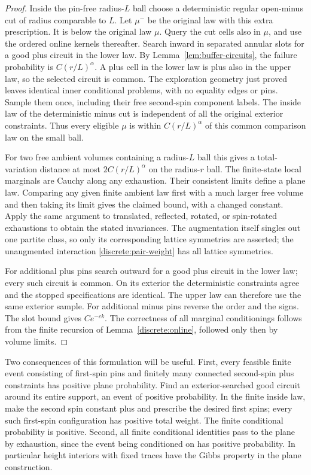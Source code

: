 \documentclass[11pt]{article}
\theoremstyle{definition}
\theoremstyle{remark}
\numberwithin{equation}{section}
\begin{document}
\begin{proof}
Inside the pin-free radius-$L$ ball choose a deterministic regular
open-minus cut of radius comparable to $L$. Let $\mu^-$ be the original
law with this extra prescription. It is below the original law $\mu$.
Query the cut cells also in $\mu$, and use the ordered online kernels
thereafter. Search inward in separated annular slots for a good plus
circuit in the lower law. By Lemma~\ref{lem:buffer-circuits}, the failure
probability is $C(r/L)^\alpha$. A plus cell in the lower law is plus also
in the upper law, so the selected circuit is common. The exploration
geometry just proved leaves identical inner conditional problems, with
no equality edges or pins. Sample them once, including their free
second-spin component labels. The inside law of the deterministic minus
cut is independent of all the original exterior constraints. Thus every
eligible $\mu$ is within $C(r/L)^\alpha$ of this common comparison law
on the small ball.

For two free ambient volumes containing a radius-$L$ ball this gives a
total-variation distance at most $2C(r/L)^\alpha$ on the radius-$r$ ball.
The finite-state local marginals are Cauchy along any exhaustion. Their
consistent limits define a plane law. Comparing any given finite ambient
law first with a much larger free volume and then taking its limit gives
the claimed bound, with a changed constant. Apply the same argument to
translated, reflected, rotated, or spin-rotated exhaustions to obtain the
stated invariances. The augmentation itself singles out one partite
class, so only its corresponding lattice symmetries are asserted; the
unaugmented interaction \eqref{discrete:pair-weight} has all lattice
symmetries.

For additional plus pins search outward for a good plus circuit in the
lower law; every such circuit is common. On its exterior the deterministic
constraints agree and the stopped specifications are identical. The
upper law can therefore use the same exterior sample. For additional
minus pins reverse the order and the signs. The slot bound gives
$Ce^{-ck}$. The correctness of all marginal conditionings follows from
the finite recursion of Lemma~\ref{discrete:online}, followed only then by
volume limits.
\end{proof}

Two consequences of this formulation will be useful. First, every feasible
finite event consisting of first-spin pins and finitely many connected
second-spin plus constraints has positive plane probability. Find an
exterior-searched good circuit around its entire support, an event of
positive probability. In the finite inside law, make the second spin
constant plus and prescribe the desired first spins; every such first-spin
configuration has positive total weight. The finite conditional
probability is positive. Second, all finite conditional identities pass
to the plane by exhaustion, since the event being conditioned on has
positive probability. In particular height interiors with fixed traces
have the Gibbs property in the plane construction.
\end{document}

